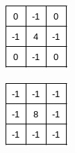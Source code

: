 \begin{figure}
     \begin{subfigure}{0.2\linewidth}
         \centering
         \includegraphics[trim={0 4 4 0},clip,width=\textwidth]{Chapters/chapter2/figs/Laplacian_std1.png}
         \caption{}
         \label{fig:Laplacian_std1}
     \end{subfigure}
     \hfill
     \begin{subfigure}{0.2\linewidth}
         \centering
         \includegraphics[trim={0 4 4 0},clip,width=\textwidth]{Chapters/chapter2/figs/Laplacian_std2.png}

\end{subfigure}
\end{figure}
